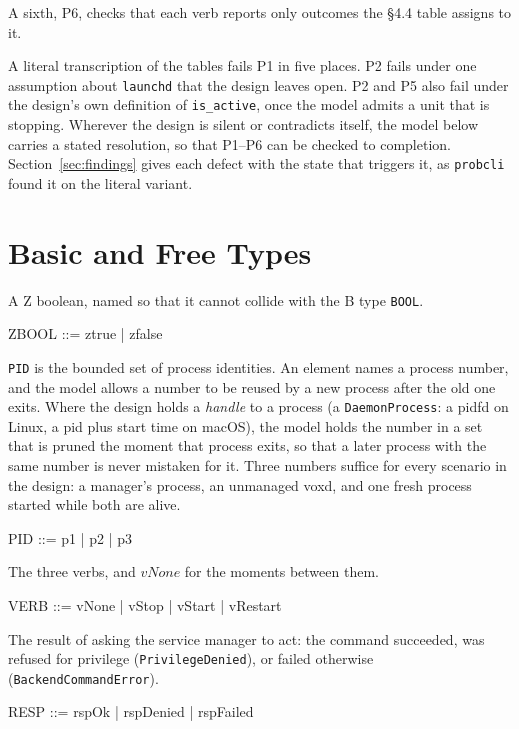 \documentclass[a4paper,10pt,fleqn]{article}
\begin{document}
A sixth, P6, checks that each verb reports only outcomes the \S4.4 table
assigns to it.

A literal transcription of the tables fails P1 in five places. P2 fails
under one assumption about \texttt{launchd} that the design leaves open.
P2 and P5 also fail under the design's own definition of
\texttt{is\_active}, once the model admits a unit that is stopping.
Wherever the design is silent or contradicts itself, the model below carries
a stated resolution, so that P1--P6 can be checked to completion.
Section~\ref{sec:findings} gives each defect with the state that triggers it,
as \texttt{probcli} found it on the literal variant.

\section{Basic and Free Types}

A Z boolean, named so that it cannot collide with the B type \texttt{BOOL}.

\begin{zed}
  ZBOOL ::= ztrue | zfalse
\end{zed}

\texttt{PID} is the bounded set of process identities. An element names a
process number, and the model allows a number to be reused by a new process
after the old one exits. Where the design holds a \emph{handle} to a process
(a \texttt{DaemonProcess}: a pidfd on Linux, a pid plus start time on macOS),
the model holds the number in a set that is pruned the moment that process
exits, so that a later process with the same number is never mistaken for it.
Three numbers suffice for every scenario in the design: a manager's process,
an unmanaged voxd, and one fresh process started while both are alive.

\begin{zed}
  PID ::= p1 | p2 | p3
\end{zed}

The three verbs, and $vNone$ for the moments between them.

\begin{zed}
  VERB ::= vNone | vStop | vStart | vRestart
\end{zed}

The result of asking the service manager to act: the command succeeded, was
refused for privilege (\texttt{PrivilegeDenied}), or failed otherwise
(\texttt{BackendCommandError}).

\begin{zed}
  RESP ::= rspOk | rspDenied | rspFailed
\end{zed}
\end{document}

